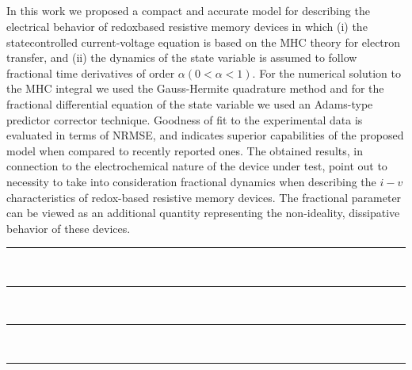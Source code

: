 \documentclass[10pt]{article}
\begin{document}
\begin{multicols}{2}
{        \section{ }
        }
        In this work we proposed a compact and accurate model for describing the electrical behavior of redoxbased resistive memory devices in which (i) the statecontrolled current-voltage equation is based on the MHC theory for electron transfer, and (ii) the dynamics of the state variable is assumed to follow fractional time derivatives of order $\alpha (0 < \alpha < 1).$
        For the numerical solution to the MHC integral we used the Gauss-Hermite quadrature method and for the fractional differential equation of the state variable we used an Adams-type predictor corrector technique. Goodness of fit to the experimental data is evaluated in terms of NRMSE, and indicates superior capabilities of the proposed model when compared to recently reported ones. The obtained results, in connection to the electrochemical nature of the device under test, point out to necessity to take into consideration fractional dynamics when describing the $i-v$ characteristics of redox-based resistive memory devices. The fractional parameter can be viewed as an additional quantity representing the non-ideality, dissipative behavior of these devices.
    \end{multicols}
    \begin{center}
        \rule{0.2\textwidth}{1pt}
        \\
        \vspace{-1.225em}
        \rule{0.3\textwidth}{0.8pt}
        \\
        \vspace{-1.225em}
        \rule{0.4\textwidth}{0.5pt}
        \\
        \vspace{-1.225em}
        \rule{0.5\textwidth}{0.4pt}
    \end{center}
\end{document}
